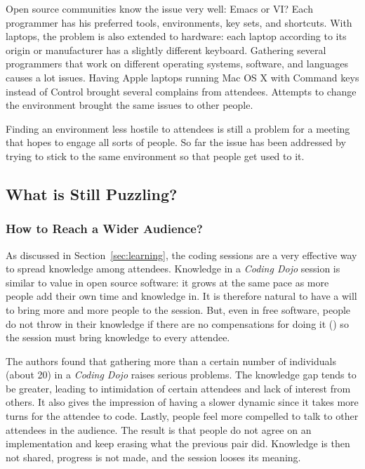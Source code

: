 Open source communities know the issue very well: Emacs or VI? Each programmer
has his preferred tools, environments, key sets, and
shortcuts. With laptops, the problem is also extended to hardware:
each laptop according to its origin or manufacturer has a slightly
different keyboard. Gathering several programmers that work on
different operating systems, software, and languages causes a lot
issues. Having Apple laptops running Mac OS X with Command keys
instead of Control brought several complains from attendees. Attempts
to change the environment brought the same issues to other people.

Finding an environment less hostile to attendees is still a problem
for a meeting that hopes to engage all sorts of people. So far the
issue has been addressed by trying to stick to the same environment so
that people get used to it.

\subsection{What is Still Puzzling?}\label{ssub:puzzles}


\subsubsection{How to Reach a Wider Audience?}

As discussed in Section~\ref{sec:learning}, the coding sessions
are a very effective way to spread knowledge among attendees. Knowledge in a
\emph{Coding Dojo} session is similar to value in open source
software: it grows at the same pace as more people add their own time
and knowledge in. It is therefore natural to have a will to bring more
and more people to the session. But, even in free software, people do not
throw in their knowledge if there are no compensations for doing it
(\cite{RishabGhosh}) so the session must bring knowledge to every
attendee.

The authors found that gathering more than a certain number of
individuals (about 20) in a \emph{Coding Dojo} raises serious
problems. The knowledge gap tends to be greater, leading to
intimidation of certain attendees and lack of interest from others. It
also gives the impression of having a slower dynamic since it takes
more turns for the attendee to code. Lastly, people feel more compelled
to talk to other attendees in the audience. The result is that people do
not agree on an implementation and keep erasing what the previous pair
did. Knowledge is then not shared, progress is not made, and the session
looses its meaning.

